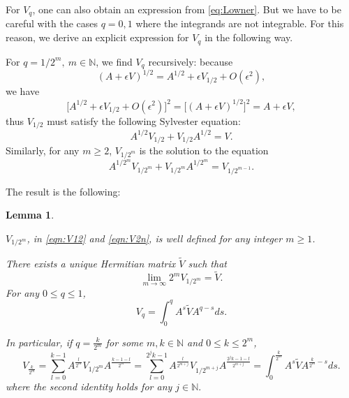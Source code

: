 \documentclass{article}
\numberwithin{equation}{section}
\newtheorem{lemma}[theorem]{Lemma}
\begin{document}
For $V_q$, one can also obtain an expression from \eqref{eq:Lowner}. But we have to be careful with the cases $q=0, 1$ where the integrands are not integrable. For this reason, we derive an explicit expression for $V_q$ in the following way. 

For $q =1/2^{m},\ m \in \mathbb{N}$, we find $V_q$ recursively: because $$(A+\epsilon V)^{1/2}=A^{1/2 }+\epsilon V_{1/2}+O(\epsilon^2),$$ we have
\begin{equation}
  \big[A^{1/2}+\epsilon V_{1/2 }+O(\epsilon^2)\big]^2=\Big[(A+\epsilon V)^{1/2}\Big]^2=A+\epsilon V, 
\end{equation} thus
$V_{1/2}$ must satisfy the following Sylvester equation:
\begin{equation}\label{eqn:V12}
    A^{1/2} V_{1/2} + V_{1/2} A^{1/2} = V.
\end{equation}
Similarly, for any $m \ge 2$, $V_{1/2^m}$ is the solution to the equation
\begin{equation}\label{eqn:V2n}
    A^{1/2^m} V_{1/2^m} + V_{1/2^m} A^{1/2^m} = V_{1/2^{m-1}}.
\end{equation}

The result is the following:
\begin{lemma}\label{LM:Vp}

$V_{1/2^m}$, in \eqref{eqn:V12} and \eqref{eqn:V2n}, is well defined for any integer $m\geq 1$. 

There exists a unique Hermitian matrix $\widetilde{V}$ such that
\begin{equation}\label{eq:tildeV}
    \lim_{m \to \infty} 2^m V_{1/2^m} = \widetilde{V}.
\end{equation}
For any $0 \le q \le 1$,
\begin{equation}\label{eq:generalVq}
    V_q = \int_0^q A^s \widetilde{V} A^{q-s} ds.
\end{equation}


In particular, if $q = \frac{k}{2^m}$ for some $m, k \in \mathbb{N}$ and $0 \leq k \leq 2^m$,
\begin{equation}\label{eq:Vkn}
    V_{\frac{k}{2^m}} = \sum_{l=0}^{k-1} A^{\frac{l}{2^m}} V_{1/2^{m}} A^{\frac{k-1-l}{2^m}}=\sum_{l=0}^{2^j k-1} A^{\frac{l}{2^{m+j}}} V_{1/2^{m+j}} A^{\frac{2^j k-1-l}{2^{m+j}}}=\int_{0}^{\frac{k}{2^m}} A^s \widetilde{V} A^{\frac{k}{2^m}-s} ds.
\end{equation} where the second identity holds for any $j\in \mathbb{N}.$
\end{lemma}
\end{document}
